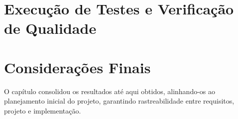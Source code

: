 \section{Execução de Testes e Verificação de Qualidade}


\section*{Considerações Finais}

O capítulo consolidou os resultados até aqui obtidos, alinhando-os ao planejamento inicial do projeto, garantindo rastreabilidade entre requisitos, projeto e implementação.
